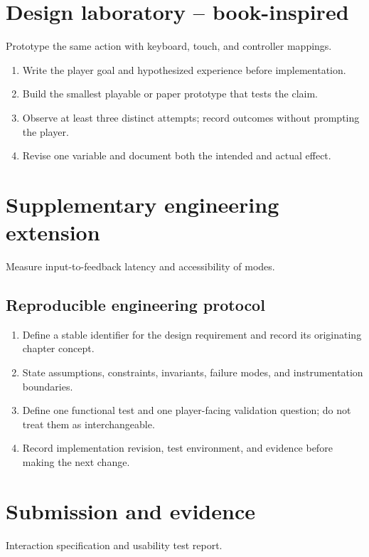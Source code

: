 \documentclass[11pt]{article}
\begin{document}
\section{Design laboratory -- book-inspired}
Prototype the same action with keyboard, touch, and controller mappings.

\begin{enumerate}
\item Write the player goal and hypothesized experience before implementation.
\item Build the smallest playable or paper prototype that tests the claim.
\item Observe at least three distinct attempts; record outcomes without prompting the player.
\item Revise one variable and document both the intended and actual effect.
\end{enumerate}

\section{Supplementary engineering extension}
Measure input-to-feedback latency and accessibility of modes.


\subsection{Reproducible engineering protocol}
\begin{enumerate}
\item Define a stable identifier for the design requirement and record its originating chapter concept.
\item State assumptions, constraints, invariants, failure modes, and instrumentation boundaries.
\item Define one functional test and one player-facing validation question; do not treat them as interchangeable.
\item Record implementation revision, test environment, and evidence before making the next change.
\end{enumerate}

\section{Submission and evidence}
Interaction specification and usability test report.
\end{document}

